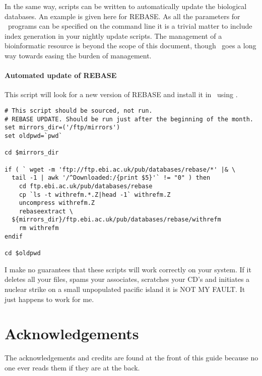 \documentclass{report}
\begin{document}
In the same way, scripts can be written to automatically update the biological databases. An example is given here for REBASE. As all the parameters for \EMBOSS\ programs can be specified on the command line it is a trivial matter to include index generation in your nightly update scripts. The management of a bioinformatic resource is beyond the scope of this document, though \EMBOSS\ goes a long way towards easing the burden of management.

\subsubsection{Automated update of REBASE}

This script will look for a new version of REBASE and install it in \EMBOSS\ using . 

\begin{verbatim}
# This script should be sourced, not run.
# REBASE UPDATE. Should be run just after the beginning of the month.
set mirrors_dir=('/ftp/mirrors')
set oldpwd=`pwd`

cd $mirrors_dir

if ( ` wget -m 'ftp://ftp.ebi.ac.uk/pub/databases/rebase/*' |& \
  tail -1 | awk '/^Downloaded:/{print $5}'` != "0" ) then 
	cd ftp.ebi.ac.uk/pub/databases/rebase
	cp `ls -t withrefm.*.Z|head -1` withrefm.Z
	uncompress withrefm.Z
	rebaseextract \
  ${mirrors_dir}/ftp.ebi.ac.uk/pub/databases/rebase/withrefm 
	rm withrefm
endif 

cd $oldpwd
\end{verbatim}

I make no guarantees that these scripts will work correctly on your system. If it deletes all your files, spams your associates, scratches your CD's and initiates a nuclear strike on a small unpopulated pacific island it is NOT MY FAULT.
It just happens to work for me.

\chapter{Acknowledgements}

The acknowledgements and credits are found at the front of this guide because no one ever reads them if they are at the back. 
\end{document}
